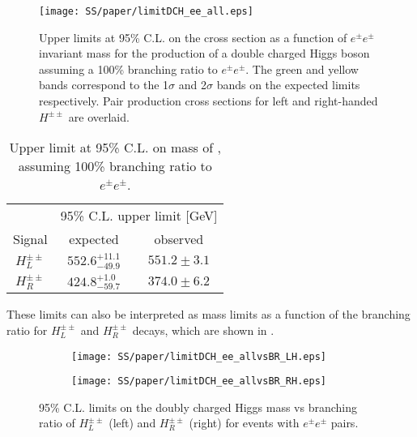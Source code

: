 \begin{figure}[h]
\begin{center}
\texttt{[image: SS/paper/limitDCH\_ee\_all.eps]}
\caption{Upper limits at 95\% C.L. on the cross section as a function of $e^{\pm}e^{\pm}$ invariant mass for the production of a double charged Higgs boson 
assuming a 100\% branching ratio to $e^{\pm}e^{\pm}$. The green and yellow bands correspond to the 1$\sigma$ and 2$\sigma$ bands on the expected limits respectively.
Pair production cross sections for left and right-handed $H^{\pm\pm}$ are overlaid.}
\label{fig:dch_limits_mass}
\end{center}
\end{figure}

\begin{table}[htbp]
\begin{center}
\begin{tabular}{c||c|c}
& \multicolumn{2}{c}{95\%  C.L. upper limit [GeV]}\\
Signal & expected & observed \\
\hline
$H^{\pm\pm}_L$ & $552.6^{+11.1}_{-49.9}$ & $551.2 \pm 3.1$ \\
\hline
$H^{\pm\pm}_R$ & $424.8^{+1.0}_{-59.7}$ & $374.0 \pm 6.2$ \\
\end{tabular}
\end{center}
\caption{Upper limit at 95\% C.L. on mass of \dch, assuming 100\% branching ratio to $e^{\pm}e^{\pm}$.}
\label{tab:limits_mass}
\end{table}

These limits can also be interpreted as mass limits as a function of the branching ratio for $H^{\pm\pm}_L$ and $H^{\pm\pm}_R$ decays, which are shown in .

\begin{figure}
\begin{subfigure}{.5\textwidth}
  \centering
  \texttt{[image: SS/paper/limitDCH\_ee\_allvsBR\_LH.eps]}
\end{subfigure}%
\begin{subfigure}{.5\textwidth}
  \centering
  \texttt{[image: SS/paper/limitDCH\_ee\_allvsBR\_RH.eps]}
\end{subfigure}
\caption{95\% C.L. limits on the doubly charged Higgs mass vs 
branching ratio of $H^{\pm\pm}_L$ (left) and $H^{\pm\pm}_R$ (right) for events with $e^{\pm}e^{\pm}$ pairs.}
  \label{fig:dch_limits_BR}
\end{figure}

